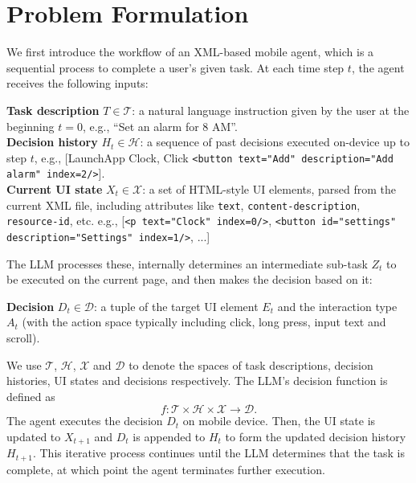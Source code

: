 \section{Problem Formulation} \label{Problem Formulation}
We first introduce the workflow of an XML-based mobile agent, which is a sequential process to complete a user's given task. At each time step \(t\), the agent receives the following inputs:

\textbf{Task description} $T \in \mathcal{T}$: a natural language instruction given by the user at the beginning \(t=0\), e.g., ``Set an alarm for 8 AM''.\\
\textbf{Decision history} $H_t \in \mathcal{H}$: a sequence of past decisions executed on-device up to step $t$, e.g., [LaunchApp Clock, Click \texttt{<button text="Add" description="Add alarm" index=2/>}].\\
\textbf{Current UI state} $X_t \in \mathcal{X}$: a set of HTML-style UI elements, parsed from the current XML file, including attributes like \texttt{text}, \texttt{content-description}, \texttt{resource-id}, etc. e.g., [\texttt{<p text="Clock" index=0/>}, \texttt{<button id="settings" description="Settings" index=1/>}, ...]

The LLM processes these, internally determines an intermediate sub-task \(Z_t\) to be executed on the current page, and then makes the decision based on it: 

\textbf{Decision} \(D_t \in \mathcal{D}\): a tuple of the target UI element \(E_t\) and the interaction type \(A_t\) (with the action space typically including click, long press, input text and scroll). 

We use \(\mathcal{T}\), \(\mathcal{H}\), \(\mathcal{X}\) and \(\mathcal{D}\) to denote the spaces of task descriptions, decision histories, UI states and decisions respectively. The LLM's decision function is defined as
\begin{equation}
f: \mathcal{T} \times \mathcal{H} \times \mathcal{X} \rightarrow \mathcal{D}.
\end{equation}
The agent executes the decision \(D_t\) on mobile device. Then, the UI state is updated to \(X_{t+1}\) and \(D_t\) is appended to \(H_t\) to form the updated decision history \(H_{t+1}\). This iterative process continues until the LLM determines that the task is complete, at which point the agent terminates further execution.


